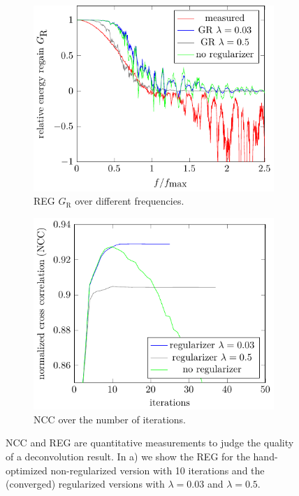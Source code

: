 \documentclass{juliacon}
\begin{document}
        \begin{figure}[h]
            \centering
            \begin{subfigure}[b]{.23\textwidth}
                \centering
                \includegraphics[width =\textwidth]{figures/test_chart_relative_energy_regain.pdf}
                \caption{REG $G_\textrm{R}$ over different frequencies.}
                \label{fig:rel_energy_regain}
            \end{subfigure}
            \hfill
            \begin{subfigure}[b]{.23\textwidth}
                \centering
                \includegraphics[width =1 \textwidth]{figures/test_chart_ncc.pdf}
                \caption{NCC over the number of iterations.}
                \label{fig:ncc}
            \end{subfigure}
            \caption{NCC and REG are quantitative measurements to judge the quality of a deconvolution result. 
                In a) we show the REG for the hand-optimized non-regularized version with 10 iterations and the (converged) regularized versions with $\lambda=0.03$ and $\lambda=0.5$.}
        \end{figure}
\end{document}
